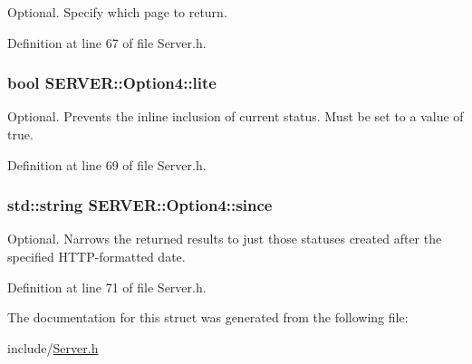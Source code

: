 Optional. Specify which page to return. 



Definition at line 67 of file Server.h.\hypertarget{structSERVER_1_1Option4_d5cb29165acf0bef7d33e2b1bbd034a1}{
\subsubsection{\setlength{\rightskip}{0pt plus 5cm}bool {\bf SERVER::Option4::lite}}}
\label{structSERVER_1_1Option4_d5cb29165acf0bef7d33e2b1bbd034a1}


Optional. Prevents the inline inclusion of current status. Must be set to a value of true. 



Definition at line 69 of file Server.h.\hypertarget{structSERVER_1_1Option4_4d7eaf322b263a5a82cc9010e24def48}{
\subsubsection{\setlength{\rightskip}{0pt plus 5cm}std::string {\bf SERVER::Option4::since}}}
\label{structSERVER_1_1Option4_4d7eaf322b263a5a82cc9010e24def48}


Optional. Narrows the returned results to just those statuses created after the specified HTTP-formatted date. 



Definition at line 71 of file Server.h.

The documentation for this struct was generated from the following file:\begin{CompactItemize}
\item 
include/\hyperlink{Server_8h}{Server.h}\end{CompactItemize}
